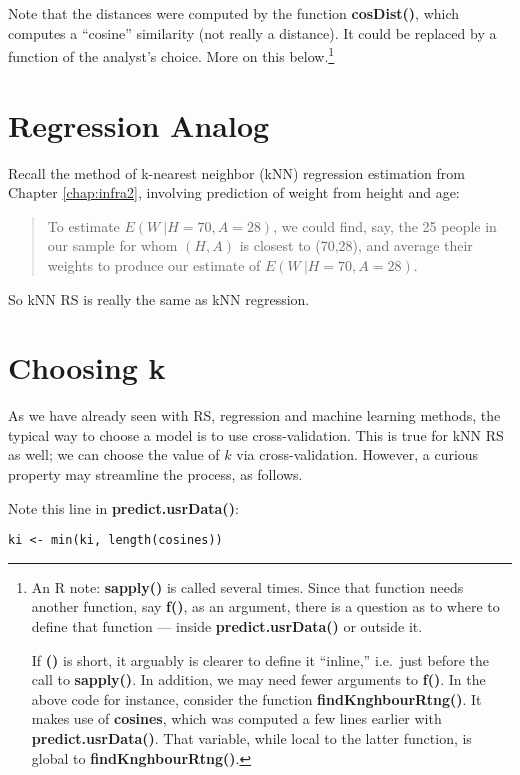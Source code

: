 Note that the distances were computed by the function
\textbf{cosDist()}, which computes a ``cosine'' similarity (not really a
distance).  It could be replaced by a function of the analyst's choice.
More on this below.\footnote{An R note: \textbf{sapply()} is called
several times.  Since that function needs another function, say
\textbf{f()}, as an argument, there is a question as to where to define
that function --- inside \textbf{predict.usrData()} or outside it.

If \textbf{()} is short, it arguably is clearer to define it
``inline,'' i.e.\ just before the call to \textbf{sapply()}.  In
addition, we may need fewer arguments to \textbf{f()}.  In the above
code for instance, consider the function \textbf{findKnghbourRtng()}.
It makes use of \textbf{cosines}, which was computed a few lines earlier
with \textbf{predict.usrData()}.  That variable, while local to the
latter function, is global to \textbf{findKnghbourRtng()}.}

\section{Regression Analog}

Recall the method of k-nearest neighbor (kNN) regression estimation from
Chapter \ref{chap:infra2}, involving prediction of weight from height
and age:

\begin{quote}
To estimate $E(W ~| H=70, A=28)$, we could find, say, the 25 people in our
sample for whom $(H,A)$ is closest to (70,28), and average their weights
to produce our estimate of $E(W ~| H=70, A=28)$.
\end{quote}

So kNN RS is really the same as kNN regression.

\section{Choosing k}

As we have already seen with RS, regression and machine learning methods, 
the typical way to choose a model is to use cross-validation.  This is
true for kNN RS as well; we can choose the value of $k$ via
cross-validation.  However, a curious property may streamline the
process, as follows.

Note this line in \textbf{predict.usrData()}:

\begin{lstlisting}
ki <- min(ki, length(cosines))
\end{lstlisting}

